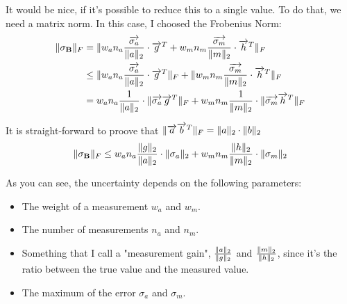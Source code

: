 It would be nice, if it's possible to reduce this to a single value. To do that, we need a matrix norm. In this case, I choosed the Frobenius Norm:
\begin{align}
\Vert{\ensuremath{\mathbf{\sigma_B}}}\Vert_{F} &= \Vert{w_a n_a \frac{\ensuremath{\overrightarrow{\sigma_a}}}{\ensuremath{\Vert{a}\Vert}_2}\cdot \ensuremath{\overrightarrow{g}^{T}} + w_m n_m \frac{\ensuremath{\overrightarrow{\sigma_m}}}{\ensuremath{\Vert{m}\Vert}_2} \cdot \ensuremath{\overrightarrow{h}^{T}}}\Vert_{F}		\\
&\le \Vert{w_a n_a \frac{\ensuremath{\overrightarrow{\sigma_a}}}{\ensuremath{\Vert{a}\Vert}_2}\cdot \ensuremath{\overrightarrow{g}^{T}}}\Vert_{F} + \Vert{w_m n_m \frac{\ensuremath{\overrightarrow{\sigma_m}}}{\ensuremath{\Vert{m}\Vert}_2} \cdot \ensuremath{\overrightarrow{h}^{T}}}\Vert_{F}		\\
&= w_a n_a \frac{1}{\Vert{a}\Vert_2}\cdot \Vert{\ensuremath{\overrightarrow{\sigma_a}} \ensuremath{\overrightarrow{g}^{T}}}\Vert_{F} + w_m n_m \frac{1}{\Vert{m}\Vert_2} \cdot \Vert{\ensuremath{\overrightarrow{\sigma_m}} \ensuremath{\overrightarrow{h}^{T}}}\Vert_{F}
\end{align}

It is straight-forward to proove that $ \Vert{\ensuremath{\overrightarrow{a}} \ensuremath{\overrightarrow{b}^{T}}}\Vert_F = \Vert{a}\Vert_2 \cdot \Vert{b}\Vert_2 $
\begin{equation}
\Vert{\ensuremath{\mathbf{\sigma_B}}}\Vert_{F} \le w_a n_a \frac{\Vert{g}\Vert_2}{\Vert{a}\Vert_2}\cdot \Vert{\sigma_a}\Vert_2 + w_m n_m \frac{\Vert{h}\Vert_2}{\Vert{m}\Vert_2} \cdot \Vert{\sigma_m}\Vert_2
\end{equation}

As you can see, the uncertainty depends on the following parameters:
\begin{itemize}
\item The weight of a measurement $w_a$ and $w_m$.
\item The number of measurements $n_a$ and $n_m$.
\item Something that I call a "measurement gain", $\frac{\Vert{a}\Vert_2}{\Vert{g}\Vert_2}$ and $\frac{\Vert{m}\Vert_2}{\Vert{h}\Vert_2}$, since it's the ratio between the true value and the measured value.
\item The maximum of the error $\sigma_a$ and $\sigma_m$.
\end{itemize}

